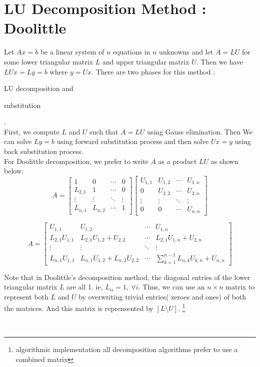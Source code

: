 \section{LU Decomposition Method : Doolittle}
	Let $Ax = b$ be a linear system of $n$ equations in $n$ unknowns and let $A = LU$ for some lower triangular matrix $L$ and upper triangular matrix $U$.
Then we have $LUx = Ly = b$ where $y = Ux$.
There are two phases for this method : \begin{enumerate*} \item LU decomposition and \item substitution \end{enumerate*}.\\

	First, we compute $L$ and $U$ such that $A = LU$ using Gauss elimination.
	Then We can solve $Ly = b$ using forward substitution process and then solve $Ux = y$ using back substitution process.\\

	For Doolittle decomposition, we prefer to write $A$ as a product $LU$ as shown below:
	\[ A = \begin{bmatrix} 1 & 0 & \cdots & 0 \\ L_{2,1} & 1 & \cdots & 0 \\ \vdots & \vdots & \ddots & \vdots \\ L_{n,1} & L_{n,2} & \cdots & 1 \end{bmatrix} \begin{bmatrix} U_{1,1} & U_{1,2} & \cdots & U_{1,n} \\ 0 & U_{2,2} & \cdots & U_{2,n} \\ \vdots & \vdots & \ddots & \vdots \\ 0 & 0 & \cdots & U_{n,n} \end{bmatrix} \]

		\[ A = \begin{bmatrix} U_{1,1} & U_{1,2} & \cdots & U_{1,n} \\ L_{2,1}U_{1,1} & L_{2,1}U_{1,2} + U_{2,2} & \cdots & L_{2,1}U_{1,n}+U_{2,n} \\ \vdots & \vdots & \ddots & \vdots \\ L_{n,1}U_{1,1} & L_{n,1}U_{1,2}+L_{n,2}U_{2,2} & \cdots & \sum_{k=1}^{n-1} L_{n,k}U_{k,n}+U_{n,n} \end{bmatrix} \]

	\begin{commentary}Note that in Doolittle's decomposition method, the diagonal entries of the lower triangular matrix $L$ are all 1.
	ie, $L_{ii} = 1,\ \forall i$.
	Thus, we can use an $n \times n$ matrix to represent both $L$ and $U$ by overwriting trivial entries( zeroes and ones) of both the matrices.
	And this matrix is reprensented by $[L\text{\textbackslash{}}U]$.
	\footnote{algorithmic implementation all decomposition algorithms prefer to use a combined matrix}\end{commentary}\\

